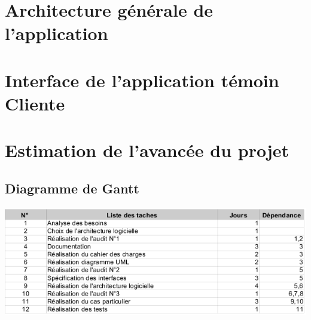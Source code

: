 \appendix
\section{Architecture générale de l'application}
\label{archi_generale}

\section{Interface de l'application témoin Cliente}
\label{screen_client}

\section{Estimation de l'avancée du projet}
\subsection{Diagramme de Gantt}
\label{gantt}

\begin{center}
\includegraphics[scale=0.7]{../diagrammes/gantt.png}
\end{center}

